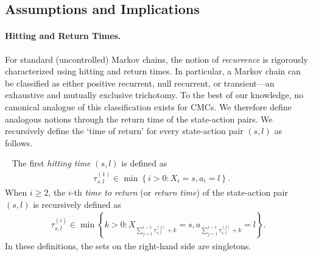\documentclass[twoside,11pt]{article}
\newcommand{\pow}[1]{^{(#1)}}%
\numberwithin{equation}{section}
\newcommand{\lc}{\left\{}
\newcommand{\rc}{\right\}}
\begin{document}
\subsection{Assumptions and Implications}
\paragraph{Hitting and Return Times.}
For standard (uncontrolled) Markov chains, the notion of \emph{recurrence} is rigorously characterized using hitting and return times. In particular, a Markov chain can be classified as either positive recurrent, null recurrent, or transient—an exhaustive and mutually exclusive trichotomy. 
To the best of our knowledge, no canonical analogue of this classification exists for CMCs. 
We therefore define analogous notions through the return time of the state-action pairs.
We recursively define the ‘time of return’ for every state-action pair $(s,l)$ as follows.
\begin{definition}~\label{def:return-time}
The first \emph{hitting time} $(s,l)$ is defined as
\begin{align*}
&\tau_{s,l}\pow{1}\in \min\lc i > 0: X_i=s, a_i=l\rc.
\end{align*}
When $i\geq2$, the $i$-th {\emph{time to return}} (or {\emph{return time}}) of the state-action pair $(s,l)$ is recursively defined as 
\begin{align*}
  \tau_{s,l} \pow i \in \min\lc k>0:X_{\sum_{j=1}^{i-1}\tau_{s,l} \pow j+k}=s,a_{\sum_{j=1}^{i-1}\tau_{s,l} \pow j+k}=l \rc.  
\end{align*}
In these definitions, the sets on the right-hand side are singletons.
\end{definition}
\end{document}
